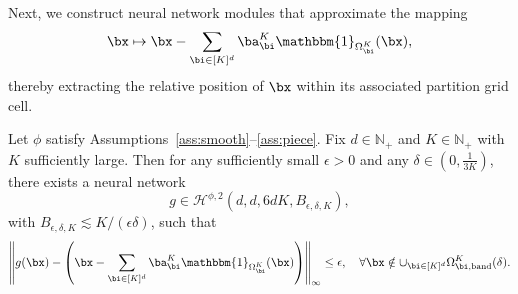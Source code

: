 \documentclass[11pt]{article}
\begin{document}
Next, we construct neural network modules that approximate the mapping
\begin{equation*}
    \bx \mapsto \bx - \sum_{\bi \in [K]^d} \ba_{\bi}^K \mathbbm{1}_{\Omega_{\bi}^K} (\bx), 
\end{equation*}
thereby extracting the relative position of $\bx$ within its associated partition grid cell.
\begin{lemma}
    Let $\phi$ satisfy Assumptions~\ref{ass:smooth}--\ref{ass:piece}. Fix $d\in\mathbb{N}_{+}$ and $K\in\mathbb{N}_{+}$ with $K$ sufficiently large.
    Then for any sufficiently small $\epsilon>0$ and any $\delta \in (0, \frac{1}{3K})$, there exists a neural network 
    \begin{equation*}
        g \in \mathcal{H}^{\phi,2}(d, d, 6dK, B_{\epsilon, \delta, K}),
    \end{equation*}
    with $B_{\epsilon, \delta, K} \lesssim K/(\epsilon \delta)$, such that
    \begin{equation}
        \left\| g(\bx) - \left( \bx - \sum_{\bi \in [K]^d} \ba_{\bi}^K \mathbbm{1}_{\Omega_{\bi}^K}(\bx) \right)\right\|_{\infty} \leq \epsilon, \quad \forall \bx \notin \cup_{\bi \in [K]^d} \Omega_{\bi, \mathrm{band}} ^K(\delta). 
        \label{eq:Linfty_relative_pos}
    \end{equation}
     \label{lem:relative_pos_app}
\end{lemma}
\end{document}
